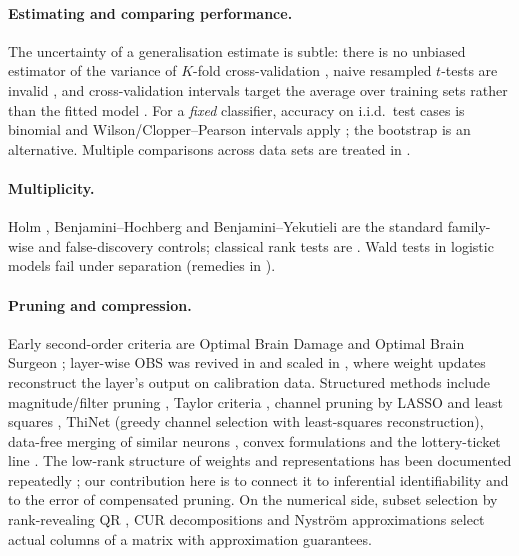 \documentclass[11pt,a4paper]{article}
\theoremstyle{remark}\newtheorem{remark}{Remark}
\begin{document}
\paragraph{Estimating and comparing performance.} The uncertainty of a generalisation estimate is subtle: there is no unbiased estimator of the variance of $K$-fold cross-validation \cite{bengio2004}, naive resampled $t$-tests are invalid \cite{nadeau2003,dietterich1998}, and cross-validation intervals target the average over training sets rather than the fitted model \cite{bates2023}. For a \emph{fixed} classifier, accuracy on i.i.d.\ test cases is binomial and Wilson/Clopper--Pearson intervals apply \cite{wilson1927,clopper1934,brown2001,agresti1998}; the bootstrap \cite{efron1979,efron1997,davison1997} is an alternative. Multiple comparisons across data sets are treated in \cite{demsar2006,benavoli2017}.
\paragraph{Multiplicity.} Holm \cite{holm1979}, Benjamini--Hochberg \cite{benjamini1995} and Benjamini--Yekutieli \cite{benjamini2001} are the standard family-wise and false-discovery controls; classical rank tests are \cite{mann1947,wilcoxon1945,kruskal1952,friedman1937}. Wald tests in logistic models fail under separation \cite{hauck1977,albert1984} (remedies in \cite{firth1993}).
\paragraph{Pruning and compression.} Early second-order criteria are Optimal Brain Damage \cite{lecun1990} and Optimal Brain Surgeon \cite{hassibi1993}; layer-wise OBS was revived in \cite{dong2017} and scaled in \cite{frantar2022,frantar2023}, where weight updates reconstruct the layer's output on calibration data. Structured methods include magnitude/filter pruning \cite{han2015,li2017}, Taylor criteria \cite{molchanov2017,molchanov2019}, channel pruning by LASSO and least squares \cite{he2017}, ThiNet \cite{luo2017} (greedy channel selection with least-squares reconstruction), data-free merging of similar neurons \cite{srinivas2015,kim2020}, convex formulations \cite{aghasi2017} and the lottery-ticket line \cite{frankle2019}. The low-rank structure of weights and representations has been documented repeatedly \cite{denil2013,raghu2017,kornblith2019,ansuini2019,aghajanyan2021,hu2022}; our contribution here is to connect it to inferential identifiability and to the error of compensated pruning. On the numerical side, subset selection by rank-revealing QR \cite{businger1965,gu1996}, CUR decompositions \cite{mahoney2009} and Nystr\"om approximations \cite{williams2001} select actual columns of a matrix with approximation guarantees.
\end{document}
